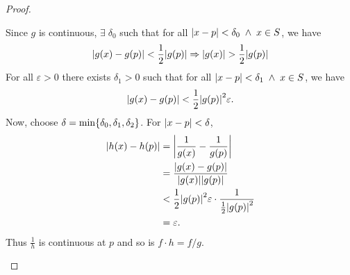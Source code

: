 \begin{proof}
\begin{enumerate}[label=(\alph*)]
        Since $g$ is continuous, $\exists\; \delta_{0}$ such that for all
        $\abs{x - p} < \delta_{0} \;\land\; x \in S$, we have \[
            \abs{g(x) - g(p)} < \frac{1}{2} \abs{g(p)} \implies \abs{g(x)} > \frac{1}{2} \abs{g(p)}
        \] For all $\varepsilon > 0$ there exists $\delta_{1} > 0$ such that for all $\abs{x - p} < \delta_{1} \;\land\; x \in S$, we have \[
            \abs{g(x) - g(p)} < \frac{1}{2} \abs{g(p)}^{2} \varepsilon.
        \] Now, choose $\delta = \min \set{\delta_{0},\delta_{1}, \delta_{2}}$. For $\abs{x - p} < \delta$,
        \begin{align*}
            \abs{h(x) - h(p)} &= \abs{\frac{1}{g(x)} - \frac{1}{g(p)}} \\
            &= \frac{\abs{g(x) - g(p)}}{\abs{g(x)} \abs{g(p)}} \\
            &< \frac{1}{2} \abs{g(p)}^{2} \varepsilon \cdot \frac{1}{\frac{1}{2} \abs{g(p)}^{2}} \\
            &= \varepsilon.
        \end{align*}
        Thus $\frac{1}{h}$ is continuous at $p$ and so is $f \cdot h = f / g$. \qedhere
    \end{enumerate}
\end{proof}
